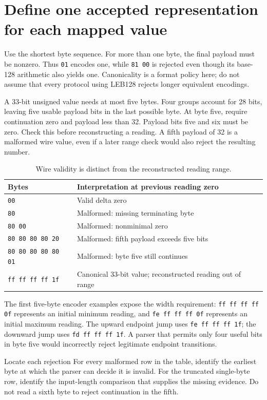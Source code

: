 \section{Define one accepted representation for each mapped value}
Use the shortest byte sequence. For more than one byte, the final payload must be
nonzero. Thus \texttt{01} encodes one, while \texttt{81 00} is rejected even though
its base-128 arithmetic also yields one. Canonicality is a format policy here; do not
assume that every protocol using LEB128 rejects longer equivalent encodings.

A 33-bit unsigned value needs at most five bytes. Four groups account for 28 bits,
leaving five usable payload bits in the last possible byte. At byte five, require
continuation zero and payload less than 32. Payload bits five and six must be zero.
Check this before reconstructing a reading. A fifth payload of 32 is a malformed
wire value, even if a later range check would also reject the resulting number.

\begin{table}[htbp]
\centering
\caption{Wire validity is distinct from the reconstructed reading range.}
\begin{tabular}{ll}
\toprule
Bytes & Interpretation at previous reading zero\\
\midrule
\texttt{00} & Valid delta zero\\
\texttt{80} & Malformed: missing terminating byte\\
\texttt{80 00} & Malformed: nonminimal zero\\
\texttt{80 80 80 80 20} & Malformed: fifth payload exceeds five bits\\
\texttt{80 80 80 80 80 01} & Malformed: byte five still continues\\
\texttt{ff ff ff ff 1f} & Canonical 33-bit value; reconstructed reading out of range\\
\bottomrule
\end{tabular}
\end{table}

The first five-byte encoder examples expose the width requirement:
\texttt{ff ff ff ff 0f} represents an initial minimum reading, and
\texttt{fe ff ff ff 0f} represents an initial maximum reading.
The upward endpoint jump uses \texttt{fe ff ff ff 1f}; the downward jump uses
\texttt{fd ff ff ff 1f}. A parser that permits only four useful bits in byte five
would incorrectly reject legitimate endpoint transitions.

\begin{MARSExercise}{Locate each rejection}
For every malformed row in the table, identify the earliest byte at which the parser
can decide it is invalid. For the truncated single-byte row, identify the input-length
comparison that supplies the missing evidence. Do not read a sixth byte to reject
continuation in the fifth.
\end{MARSExercise}
